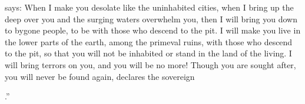 {{}
says: When I make
you desolate
like the uninhabited
cities,
when
I bring up
the deep
over
you and the surging
waters
overwhelm you,
then I will bring
you down
to bygone
people,
to
be with
those who descend
to the pit.
I will make you live
in the lower parts
of the earth,
among the primeval
ruins,
with
those who descend
to the pit,
so
that you will not
be inhabited
or stand
in the land
of the living.
I will bring terrors
on you, and you will
be no
more! Though you are sought
after, you will never
be found
again,
declares
the sovereign

{}.”

\par }
